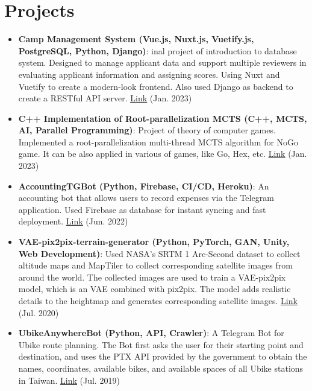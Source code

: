 \documentclass[a4paper8pt]{extarticle}
\newcommand{\resumeItem}[2]{
  \item\small{
    \textbf{#1}{: #2 \vspace{-2pt}}
  }
}
\newcommand{\resumeSubItem}[2]{\resumeItem{#1}{#2}\vspace{-3pt}}
\newcommand{\resumeSubHeadingListStart}{\begin{itemize}[leftmargin=*]}
\newcommand{\resumeSubHeadingListEnd}{\end{itemize}}
\begin{document}
\section{Projects}
\resumeSubHeadingListStart
\setlength\itemsep{0.25em}
\resumeSubItem{Camp Management System (Vue.js, Nuxt.js, Vuetify.js, PostgreSQL, Python, Django)}{inal project of introduction to database system. Designed to manage applicant data and support multiple reviewers in evaluating applicant information and assigning scores. Using Nuxt and Vuetify to create a modern-look frontend. Also used Django as backend to create a RESTful API server. \href{https://github.com/jayin92/camp-management-system}{\underline{Link}} (Jan. 2023)}
\resumeSubItem{C++ Implementation of Root-parallelization MCTS (C++, MCTS, AI, Parallel Programming)}{Project of theory of computer games. Implemented a root-parallelization multi-thread MCTS algorithm for NoGo game. It can be also applied in various of games, like Go, Hex, etc. \href{https://github.com/jayin92/NYCU-theory-of-computer-games/tree/main/project3/code}{\underline{Link}} (Jan. 2023)}
\resumeSubItem{AccountingTGBot (Python, Firebase, CI/CD, Heroku)}{An accounting bot that allows users to record expenses via the Telegram application. Used Firebase as database for instant syncing and fast deployment.  \href{https://github.com/jayin92/AccountingTGBot}{\underline{Link}} (Jun. 2022)}
\vspace{2pt}
\resumeSubItem{VAE-pix2pix-terrain-generator (Python, PyTorch, GAN, Unity, Web Development)}{Used NASA's SRTM 1 Arc-Second dataset to collect altitude maps and MapTiler to collect corresponding satellite images from around the world. The collected images are used to train a VAE-pix2pix model, which is an VAE combined with pix2pix. The model adds realistic details to the heightmap and generates corresponding satellite images. 
 \href{https://github.com/jayin92/pix2pix-terrain-generator}{\underline{Link}} (Jul. 2020)}
\vspace{2pt}
\resumeSubItem{UbikeAnywhereBot (Python, API, Crawler)}{A Telegram Bot for Ubike route planning. The Bot first asks the user for their starting point and destination, and uses the PTX API provided by the government to obtain the names, coordinates, available bikes, and available spaces of all Ubike stations in Taiwan. 
 \href{https://github.com/jayin92/UBikeAnywhereBot}{\underline{Link}} (Jul. 2019)}
\resumeSubHeadingListEnd
\end{document}
